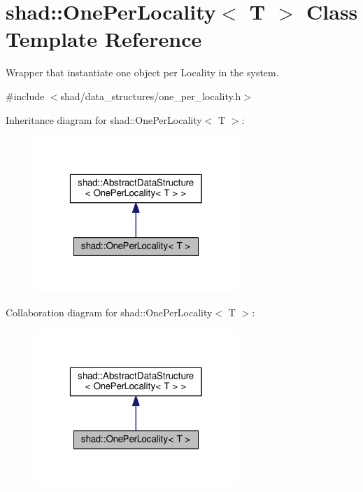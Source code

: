 \hypertarget{classshad_1_1OnePerLocality}{\section{shad\-:\-:One\-Per\-Locality$<$ T $>$ Class Template Reference}
\label{classshad_1_1OnePerLocality}
}


Wrapper that instantiate one object per Locality in the system.  




{\ttfamily \#include $<$shad/data\-\_\-structures/one\-\_\-per\-\_\-locality.\-h$>$}



Inheritance diagram for shad\-:\-:One\-Per\-Locality$<$ T $>$\-:
\nopagebreak
\begin{figure}[H]
\begin{center}
\leavevmode
\includegraphics[width=220pt]{classshad_1_1OnePerLocality__inherit__graph}
\end{center}
\end{figure}


Collaboration diagram for shad\-:\-:One\-Per\-Locality$<$ T $>$\-:
\nopagebreak
\begin{figure}[H]
\begin{center}
\leavevmode
\includegraphics[width=220pt]{classshad_1_1OnePerLocality__coll__graph}
\end{center}
\end{figure}

